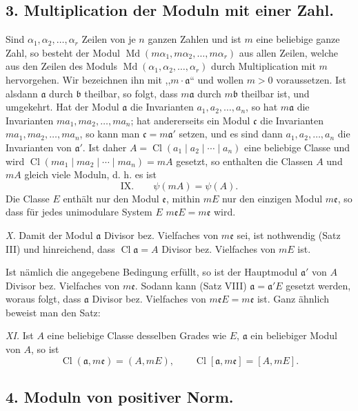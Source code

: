 \documentclass[11pt,a4paper]{article}
\newcommand{\Cl}{\operatorname{Cl}}
\newcommand{\Md}{\operatorname{Md}}
\begin{document}
\subsection*{3. Multiplication der Moduln mit einer Zahl.}

Sind $\alpha_1,\alpha_2,\ldots,\alpha_r$ Zeilen von je $n$ ganzen Zahlen und ist $m$ eine beliebige ganze Zahl, so besteht der Modul $\Md(m\alpha_1,m\alpha_2,\ldots,m\alpha_r)$ aus allen Zeilen, welche aus den Zeilen des Moduls $\Md(\alpha_1,\alpha_2,\ldots,\alpha_r)$ durch Multiplication mit $m$ hervorgehen. Wir bezeichnen ihn mit ,,$m\cdot\mathfrak a$`` und wollen $m>0$ voraussetzen. Ist alsdann $\mathfrak a$ durch $\mathfrak b$ theilbar, so folgt, dass $m\mathfrak a$ durch $m\mathfrak b$ theilbar ist, und umgekehrt. Hat der Modul $\mathfrak a$ die Invarianten $a_1,a_2,\ldots,a_n$, so hat $m\mathfrak a$ die Invarianten $ma_1,ma_2,\ldots,ma_n$; hat andererseits ein Modul $\mathfrak c$ die Invarianten $ma_1,ma_2,\ldots,ma_n$, so kann man $\mathfrak c=m\mathfrak a'$ setzen, und es sind dann $a_1,a_2,\ldots,a_n$ die Invarianten von $\mathfrak a'$. Ist daher $A=\Cl(a_1\mid a_2\mid\cdots\mid a_n)$ eine beliebige Classe und wird $\Cl(ma_1\mid ma_2\mid\cdots\mid ma_n)=mA$ gesetzt, so enthalten die Classen $A$ und $mA$ gleich viele Moduln, d. h. es ist
\[
\text{IX.}\qquad \psi(mA)=\psi(A).
\]
Die Classe $E$ enthält nur den Modul $\mathfrak e$, mithin $mE$ nur den einzigen Modul $m\mathfrak e$, so dass für jedes unimodulare System $E$ $m\mathfrak eE=m\mathfrak e$ wird.

\emph{X.} Damit der Modul $\mathfrak a$ Divisor bez. Vielfaches von $m\mathfrak e$ sei, ist nothwendig (Satz III) und hinreichend, dass $\Cl\mathfrak a=A$ Divisor bez. Vielfaches von $mE$ ist.

Ist nämlich die angegebene Bedingung erfüllt, so ist der Hauptmodul $\mathfrak a'$ von $A$ Divisor bez. Vielfaches von $m\mathfrak e$. Sodann kann (Satz VIII) $\mathfrak a=\mathfrak a'E$ gesetzt werden, woraus folgt, dass $\mathfrak a$ Divisor bez. Vielfaches von $m\mathfrak eE=m\mathfrak e$ ist. Ganz ähnlich beweist man den Satz:

\emph{XI.} Ist $A$ eine beliebige Classe desselben Grades wie $E$, $\mathfrak a$ ein beliebiger Modul von $A$, so ist
\[
 \Cl(\mathfrak a,m\mathfrak e)=(A,mE),
 \qquad
 \Cl[\mathfrak a,m\mathfrak e]=[A,mE].
\]

\subsection*{4. Moduln von positiver Norm.}
\end{document}
